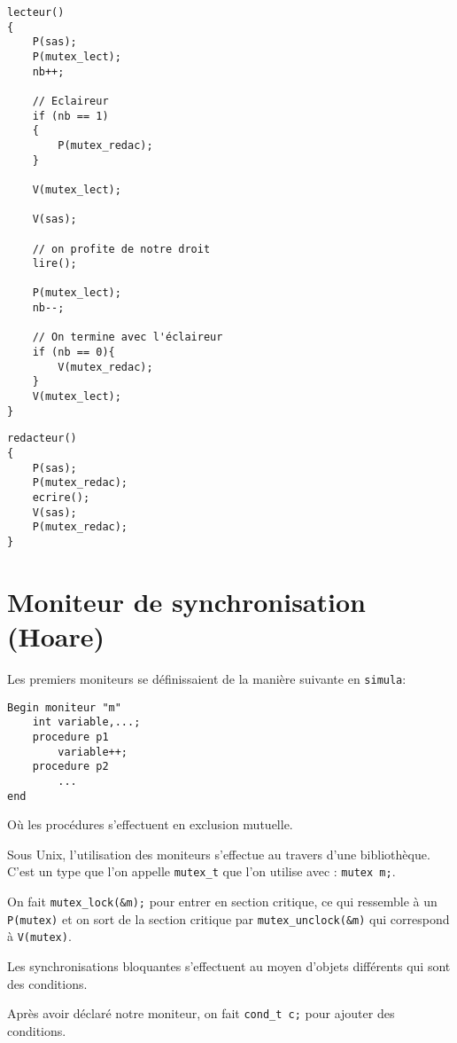 \documentclass[12pt,a4paper]{report}
\begin{document}
\begin{minipage}{0.6\linewidth}
\begin{verbatim}
lecteur()
{
    P(sas);
    P(mutex_lect);
    nb++;

    // Eclaireur
    if (nb == 1)
    {
        P(mutex_redac);
    }

    V(mutex_lect);

    V(sas);

    // on profite de notre droit
    lire();

    P(mutex_lect);
    nb--;

    // On termine avec l'éclaireur
    if (nb == 0){
        V(mutex_redac);
    }
    V(mutex_lect);
}
\end{verbatim}
\end{minipage}
\begin{minipage}{0.4\linewidth}
\begin{verbatim}
redacteur()
{
    P(sas);
    P(mutex_redac);
    ecrire();
    V(sas);
    P(mutex_redac);
}
\end{verbatim}
\end{minipage}


\section{Moniteur de synchronisation (Hoare)}

Les premiers moniteurs se définissaient de la manière suivante en \texttt{simula}:

\begin{verbatim}
Begin moniteur "m"
    int variable,...;
    procedure p1
        variable++;
    procedure p2
        ...
end
\end{verbatim}

Où les procédures s'effectuent en exclusion mutuelle.

Sous Unix, l'utilisation des moniteurs s'effectue au travers d'une bibliothèque. C'est un type que l'on appelle \verb?mutex_t? que l'on utilise avec : \verb?mutex m;?.

On fait \verb?mutex_lock(&m);? pour entrer en section critique, ce qui ressemble à un \verb?P(mutex)? et on sort de la section critique par \verb?mutex_unclock(&m)? qui correspond à \verb?V(mutex)?.

Les synchronisations bloquantes s'effectuent au moyen d'objets différents qui sont des \og conditions\fg{}.

Après avoir déclaré notre moniteur, on fait \verb?cond_t c;? pour ajouter des conditions.
\end{document}
